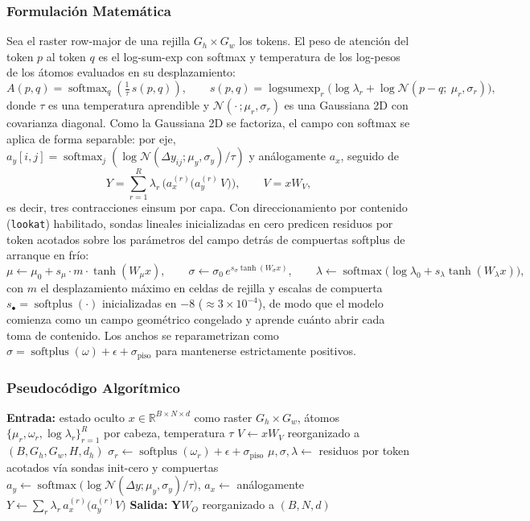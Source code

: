 \subsubsection{Formulación Matemática}
Sea el raster row-major de una rejilla $G_h \times G_w$ los tokens. El peso de atención del token $p$ al token $q$ es el log-sum-exp con softmax y temperatura de los log-pesos de los átomos evaluados en su desplazamiento:
\[
A(p, q) = \operatorname{softmax}_q\!\left( \tfrac{1}{\tau}\, s(p, q) \right),
\qquad
s(p, q) = \operatorname{logsumexp}_r \big( \log \lambda_r + \log \mathcal{N}(p - q;\ \mu_r, \sigma_r) \big),
\]
donde $\tau$ es una temperatura aprendible y $\mathcal{N}(\cdot\,;\mu_r, \sigma_r)$ es una Gaussiana 2D con covarianza diagonal. Como la Gaussiana 2D se factoriza, el campo con softmax se aplica de forma separable: por eje, $a_y[i, j] = \operatorname{softmax}_j(\log \mathcal{N}(\Delta y_{ij}; \mu_y, \sigma_y) / \tau)$ y análogamente $a_x$, seguido de
\[
Y = \sum_{r=1}^{R} \lambda_r\, \big( a_x^{(r)} \big( a_y^{(r)}\, V \big) \big),
\qquad V = x W_V,
\]
es decir, tres contracciones einsum por capa. Con direccionamiento por contenido (\texttt{lookat}) habilitado, sondas lineales inicializadas en cero predicen residuos por token acotados sobre los parámetros del campo detrás de compuertas softplus de arranque en frío:
\[
\mu \leftarrow \mu_0 + s_\mu \cdot m \cdot \tanh(W_\mu x), \qquad
\sigma \leftarrow \sigma_0 \, e^{s_\sigma \tanh(W_\sigma x)}, \qquad
\lambda \leftarrow \operatorname{softmax}\big( \log \lambda_0 + s_\lambda \tanh(W_\lambda x) \big),
\]
con $m$ el desplazamiento máximo en celdas de rejilla y escalas de compuerta $s_\bullet = \operatorname{softplus}(\cdot)$ inicializadas en $-8$ ($\approx 3 \times 10^{-4}$), de modo que el modelo comienza como un campo geométrico congelado y aprende cuánto abrir cada toma de contenido. Los anchos se reparametrizan como $\sigma = \operatorname{softplus}(\omega) + \epsilon + \sigma_{\text{piso}}$ para mantenerse estrictamente positivos.

\subsubsection{Pseudocódigo Algorítmico}
\begin{algorithmic}[1]
\State \textbf{Entrada:} estado oculto $x \in \mathbb{R}^{B \times N \times d}$ como raster $G_h \times G_w$, átomos $\{\mu_r, \omega_r, \log \lambda_r\}_{r=1}^{R}$ por cabeza, temperatura $\tau$
\State $V \gets x W_V$ reorganizado a $(B, G_h, G_w, H, d_h)$ 
\State $\sigma_r \gets \operatorname{softplus}(\omega_r) + \epsilon + \sigma_{\text{piso}}$ 
    \State $\mu, \sigma, \lambda \gets$ residuos por token acotados vía sondas init-cero y compuertas 
\EndIf
\State $a_y \gets \operatorname{softmax}\!\big(\log \mathcal{N}(\Delta y; \mu_y, \sigma_y) / \tau\big)$, \quad $a_x \gets$ análogamente 
\State $Y \gets \sum_r \lambda_r\, a_x^{(r)} \big( a_y^{(r)} V \big)$ 
\State \textbf{Salida:} $\mathbf{Y} W_O$ reorganizado a $(B, N, d)$
\end{algorithmic}

